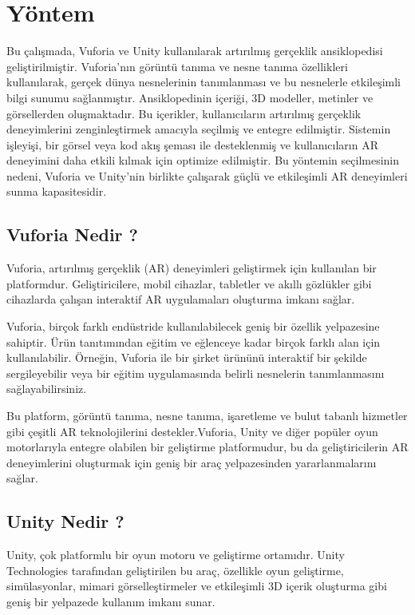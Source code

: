 \documentclass[12pt, a4paper]{article}
\begin{document}
	\section{Yöntem}
	Bu çalışmada, Vuforia ve Unity kullanılarak artırılmış gerçeklik ansiklopedisi geliştirilmiştir. Vuforia'nın görüntü tanıma ve nesne tanıma özellikleri kullanılarak, gerçek dünya nesnelerinin tanımlanması ve bu nesnelerle etkileşimli bilgi sunumu sağlanmıştır. Ansiklopedinin içeriği, 3D modeller, metinler ve görsellerden oluşmaktadır. Bu içerikler, kullanıcıların artırılmış gerçeklik deneyimlerini zenginleştirmek amacıyla seçilmiş ve entegre edilmiştir. Sistemin işleyişi, bir görsel veya kod akış şeması ile desteklenmiş ve kullanıcıların AR deneyimini daha etkili kılmak için optimize edilmiştir. Bu yöntemin seçilmesinin nedeni, Vuforia ve Unity'nin birlikte çalışarak güçlü ve etkileşimli AR deneyimleri sunma kapasitesidir.
	\subsection{Vuforia Nedir ?}
	
	Vuforia, artırılmış gerçeklik (AR) deneyimleri geliştirmek için kullanılan bir platformdur. Geliştiricilere, mobil cihazlar, tabletler ve akıllı gözlükler gibi cihazlarda çalışan interaktif AR uygulamaları oluşturma imkanı sağlar.
	
	Vuforia, birçok farklı endüstride kullanılabilecek geniş bir özellik yelpazesine sahiptir. Ürün tanıtımından eğitim ve eğlenceye kadar birçok farklı alan için kullanılabilir. Örneğin, Vuforia ile bir şirket ürününü interaktif bir şekilde sergileyebilir veya bir eğitim uygulamasında belirli nesnelerin tanımlanmasını sağlayabilirsiniz.
	
	Bu platform, görüntü tanıma, nesne tanıma, işaretleme ve bulut tabanlı hizmetler gibi çeşitli AR teknolojilerini destekler.Vuforia, Unity ve diğer popüler oyun motorlarıyla entegre olabilen bir geliştirme platformudur, bu da geliştiricilerin AR deneyimlerini oluşturmak için geniş bir araç yelpazesinden yararlanmalarını sağlar\cite{Vuforia}.
	\subsection{Unity Nedir ?}
	Unity, çok platformlu bir oyun motoru ve geliştirme ortamıdır. Unity Technologies tarafından geliştirilen bu araç, özellikle oyun geliştirme, simülasyonlar, mimari görselleştirmeler ve etkileşimli 3D içerik oluşturma gibi geniş bir yelpazede kullanım imkanı sunar.
	
\end{document}
